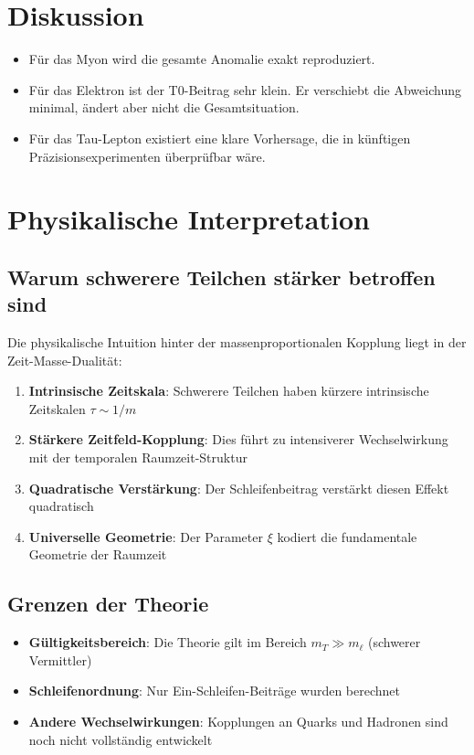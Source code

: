\documentclass[12pt,a4paper]{article}
\theoremstyle{definition}
\begin{document}
	\section*{Diskussion}
	\begin{itemize}
		\item Für das Myon wird die gesamte Anomalie exakt reproduziert.
		\item Für das Elektron ist der T0-Beitrag sehr klein. Er verschiebt die Abweichung minimal, ändert aber nicht die Gesamtsituation.
		\item Für das Tau-Lepton existiert eine klare Vorhersage, die in künftigen Präzisionsexperimenten überprüfbar wäre.
	\end{itemize}
	
	\section{Physikalische Interpretation}
	
	\subsection{Warum schwerere Teilchen stärker betroffen sind}
	
	Die physikalische Intuition hinter der massenproportionalen Kopplung liegt in der Zeit-Masse-Dualität:
	
	\begin{enumerate}
		\item \textbf{Intrinsische Zeitskala}: Schwerere Teilchen haben kürzere intrinsische Zeitskalen $\tau \sim 1/m$
		\item \textbf{Stärkere Zeitfeld-Kopplung}: Dies führt zu intensiverer Wechselwirkung mit der temporalen Raumzeit-Struktur
		\item \textbf{Quadratische Verstärkung}: Der Schleifenbeitrag verstärkt diesen Effekt quadratisch
		\item \textbf{Universelle Geometrie}: Der Parameter $\xi$ kodiert die fundamentale Geometrie der Raumzeit
	\end{enumerate}
	
	\subsection{Grenzen der Theorie}
	
	\begin{itemize}
		\item \textbf{Gültigkeitsbereich}: Die Theorie gilt im Bereich $m_T \gg m_\ell$ (schwerer Vermittler)
		\item \textbf{Schleifenordnung}: Nur Ein-Schleifen-Beiträge wurden berechnet
		\item \textbf{Andere Wechselwirkungen}: Kopplungen an Quarks und Hadronen sind noch nicht vollständig entwickelt
	\end{itemize}
	
\end{document}
